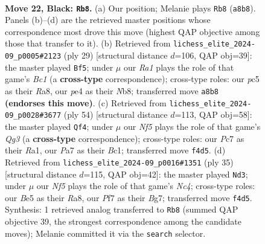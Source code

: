 \documentclass[11pt]{article}
\begin{document}
\clearpage

\begin{figure}[p]\centering
\begin{subfigure}{0.46\textwidth}\centering
\resizebox{\linewidth}{!}{%
\newchessgame
\chessboard[
  setfen={r1br4/ppp2pk1/3p4/2P1b1qp/N3Pn2/4Q1Pp/PP3P2/RBB1R1K1 b - - 0 22},
  showmover=false,
  pgfstyle=straightmove, color=movearrow, markmove={a8-b8}
]}
\caption{}
\end{subfigure}\hfill
\begin{subfigure}{0.46\textwidth}\centering
\resizebox{\linewidth}{!}{%
\newchessgame
\chessboard[
  setfen={rnbq1r1k/1pb3pp/2p5/p2nP3/2P2p2/PP3N2/2Q1BPPP/R1BR2K1 b - - 0 15},
  showmover=false,
  pgfstyle=straightmove, color=movearrow, markmove={c8-f5}
]}
\caption{}
\end{subfigure}
\\[4pt]
\begin{subfigure}{0.46\textwidth}\centering
\resizebox{\linewidth}{!}{%
\newchessgame
\chessboard[
  setfen={r1q2r2/p4ppk/4pb1p/1Pp1Nb1P/2P1n3/P5Q1/5PP1/R1B1RBK1 w - - 3 28},
  showmover=false,
  pgfstyle=straightmove, color=movearrow, markmove={g3-f4}
]}
\caption{}
\end{subfigure}\hfill
\begin{subfigure}{0.46\textwidth}\centering
\resizebox{\linewidth}{!}{%
\newchessgame
\chessboard[
  setfen={r1b2q1k/pp4bp/2n3p1/2n1p3/3pP3/Q1P3P1/PB1N1PBP/R3R1K1 b - - 1 18},
  showmover=false,
  pgfstyle=straightmove, color=movearrow, markmove={c5-d3}
]}
\caption{}
\end{subfigure}
\caption{\textbf{Move 22, Black: \texttt{Rb8}.} (a) Our position; Melanie plays \texttt{Rb8} (\texttt{a8b8}). Panels (b)--(d) are the retrieved master positions whose correspondence most drove this move (highest QAP objective among those that transfer to it). (b) Retrieved from \texttt{lichess\_elite\_2024-09\_p0005\#2123} (ply 29) [structural distance $d$=106, QAP obj=39]: the master played \texttt{Bf5}; under $\mu$ our \emph{Ra1} plays the role of that game's \emph{Bc1} (a \textbf{cross-type} correspondence); cross-type roles: our \emph{p}c5 as their \emph{R}a8, our \emph{p}e4 as their \emph{N}b8; transferred move \texttt{a8b8} \textbf{(endorses this move)}. (c) Retrieved from \texttt{lichess\_elite\_2024-09\_p0028\#3677} (ply 54) [structural distance $d$=113, QAP obj=58]: the master played \texttt{Qf4}; under $\mu$ our \emph{Nf5} plays the role of that game's \emph{Qg3} (a \textbf{cross-type} correspondence); cross-type roles: our \emph{P}c7 as their \emph{R}a1, our \emph{P}a7 as their \emph{B}c1; transferred move \texttt{f4d5}. (d) Retrieved from \texttt{lichess\_elite\_2024-09\_p0016\#1351} (ply 35) [structural distance $d$=115, QAP obj=42]: the master played \texttt{Nd3}; under $\mu$ our \emph{Nf5} plays the role of that game's \emph{Nc4}; cross-type roles: our \emph{B}e5 as their \emph{R}a8, our \emph{P}f7 as their \emph{B}g7; transferred move \texttt{f4d5}. Synthesis: 1 retrieved analog transferred to \texttt{Rb8} (summed QAP objective 39, the strongest correspondence among the candidate moves); Melanie committed it via the \texttt{search} selector.}
\label{fig:thought-m43}
\end{figure}
\end{document}
